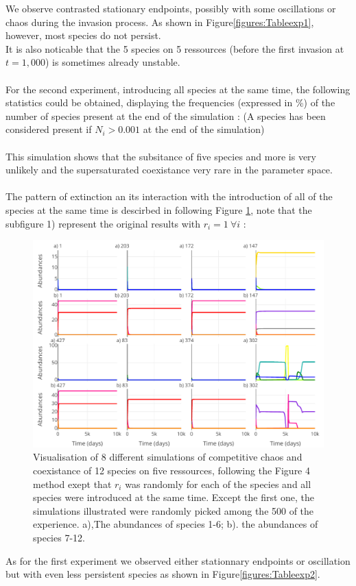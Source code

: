 We observe contrasted stationary endpoints, possibly with some oscillations or 
chaos during the invasion process. As shown in Figure\ref{figures:Tableexp1}, 
however, most species do not persist.\\
It is also noticable that the 5 species on 5 ressources (before the first 
invasion at $t=1,000$) is sometimes already unstable.\\
\\
For the second experiment, introducing all species at the same time, the 
following statistics could be obtained, displaying the frequencies (expressed in 
\%) of the number of species present at the end of the simulation : (A species 
has been considered present if $N_i > 0.001$ at the end of the simulation) \\


\\
This simulation shows that the subsitance of five species and more is very 
unlikely and the supersaturated coexistance very rare in the parameter space.\\
\\
The pattern of extinction an its interaction with the introduction of all of the 
species at the same time is descirbed in following Figure \ref{figures:Figexp2}, 
note that the subfigure 1) represent the original results with $r_i=1 ~\forall 
i$ : 
\begin{figure}[H]
\begin{center} 
 \includegraphics[width=1\textwidth]{../Code/Figures/Figure_exp2.pdf}
  \caption{Visualisation of 8 different simulations of competitive chaos and 
coexistance of 12 species on five ressources, following the Figure 4 method 
exept that $r_i$ was randomly for each of the species and all species were 
introduced at the same time. Except the first one, the simulations illustrated 
were randomly picked among the 500 of the experience. a),The abundances of 
species 1-6; b). the abundances of species 7-12.}
  \label{figures:Figexp2}
\end{center}
  \end{figure}
As for the first experiment we observed either stationnary endpoints or 
oscillation but with even less persistent species as shown in 
Figure\ref{figures:Tableexp2}.
